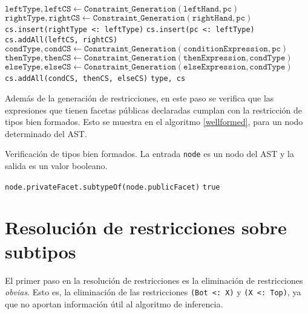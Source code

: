 \begin{algorithm}
\begin{algorithmic}[1]
              \State $\mathtt{leftType, leftCS\gets Constraint\_Generation(leftHand, pc)}$
              \State $\mathtt{rightType, rightCS\gets Constraint\_Generation(rightHand, pc)}$
              \State \texttt{cs.insert(rightType <: leftType)}
              \State \texttt{cs.insert(pc <: leftType)}
              \State \texttt{cs.addAll(leftCS, rightCS)}
            \EndCase
              \State $\mathtt{condType, condCS\gets Constraint\_Generation(conditionExpression, pc)}$
              \State $\mathtt{thenType, thenCS\gets Constraint\_Generation(thenExpression, condType)}$
              \State $\mathtt{elseType, elseCS\gets Constraint\_Generation(elseExpression, condType)}$
              \State \texttt{cs.addAll(condCS, thenCS, elseCS)}
            \EndCase
          \EndSwitch
          \State \Return \texttt{type, cs}
      \EndFunction
    \end{algorithmic}
\end{algorithm}
\clearpage

Además de la generación de restricciones, en este paso se verifica que las expresiones que tienen facetas públicas declaradas cumplan con la restricción de tipos bien formados. Esto se muestra en el algoritmo \ref{wellformed}, para un nodo determinado del AST.

\begin{algorithm}\captionsetup{labelsep=newline}
  \centering
  \caption{Verificación de tipos bien formados. La entrada \texttt{node} es un nodo del AST y la salida es un valor booleano.}
  \label{wellformed}
    \begin{algorithmic}[1]
            \State \Return \texttt{node.privateFacet.subtypeOf(node.publicFacet)}
          \EndIf
          \State \Return \texttt{true}
      \EndFunction
    \end{algorithmic}
\end{algorithm}

\section{Resolución de restricciones sobre subtipos} \label{propuestaRes}

El primer paso en la resolución de restricciones es la eliminación de restricciones \textit{obvias}. Esto es, la eliminación de las restricciones \texttt{(Bot <: X)} y \texttt{(X <: Top)}, ya que no aportan información útil al algoritmo de inferencia.

